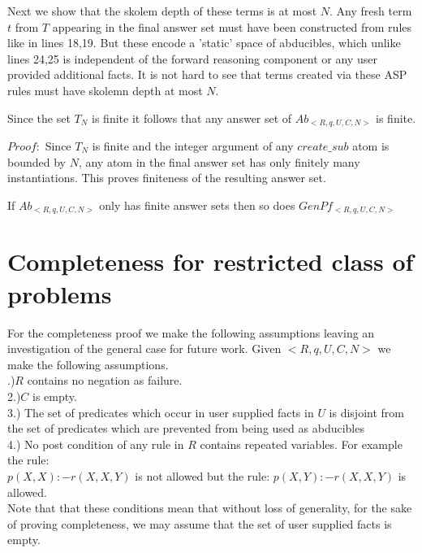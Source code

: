 \documentclass{article}
\begin{document}
\newline
Next we show that the skolem depth of these terms is at most $N$. Any fresh term $t$ from $T$ appearing in the final answer set must have been constructed from rules like in lines 18,19. But these encode a 'static' space of abducibles, which unlike lines 24,25 is independent of the forward reasoning component or any user provided additional facts. It is not hard to see that terms created via these ASP rules must have skolemn depth at most $N$. 
\begin{lemma}
Since the set $T_{N}$ is finite it follows that any answer set of $Ab_{<R,q,U,C,N>}$ is finite.\\
\end{lemma}
\newline
$Proof:$ Since $T_{N}$ is finite and the integer argument of any $create\_sub$ atom is bounded by $N$, any atom in the final answer set has only finitely many instantiations. This proves finiteness of the resulting answer set. 
\begin{lemma}
If $Ab_{<R,q,U,C,N>}$ only has finite answer sets then so does $GenPf_{<R,q,U,C,N>}$
\end{lemma}

\section{Completeness for restricted class of problems}\label{sec:completeness}
For the completeness proof we make the following assumptions leaving an investigation of the general case for future work. Given $<R,q,U,C,N>$ we make the following assumptions.\\
.)$R$ contains no negation as failure.\\
2.)$C$ is empty.\\
3.) The set of predicates which occur in user supplied facts in $U$ is disjoint from the set of predicates which are prevented from being used as abducibles\\
4.) No post condition of any rule in $R$ contains repeated variables. For example the rule:\\
$p(X,X):-r(X,X,Y)$ is not allowed but the rule: $p(X,Y):-r(X,X,Y)$ is allowed.\\
\newline
Note that that these conditions mean that without loss of generality, for the sake of proving completeness, we may assume that the set of user supplied facts is empty.
\end{document}
